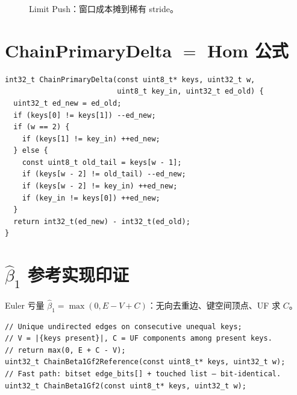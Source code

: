 \begin{figure}[htbp]
\centering
{}
\caption{Limit Push：窗口成本摊到稀有 stride。}
\label{fig:chain-amortize}
\end{figure}

\section{ChainPrimaryDelta $=$ Hom 公式}

\begin{lstlisting}[caption={与 PrimaryTopoDelta 同构},label={lst:chain-delta}]
int32_t ChainPrimaryDelta(const uint8_t* keys, uint32_t w,
                          uint8_t key_in, uint32_t ed_old) {
  uint32_t ed_new = ed_old;
  if (keys[0] != keys[1]) --ed_new;
  if (w == 2) {
    if (keys[1] != key_in) ++ed_new;
  } else {
    const uint8_t old_tail = keys[w - 1];
    if (keys[w - 2] != old_tail) --ed_new;
    if (keys[w - 2] != key_in) ++ed_new;
    if (key_in != keys[0]) ++ed_new;
  }
  return int32_t(ed_new) - int32_t(ed_old);
}
\end{lstlisting}

\section{$\hat\beta_1$ 参考实现印证}

Euler 亏量 $\hat\beta_1=\max(0,E-V+C)$：无向去重边、键空间顶点、UF 求 $C$。

\begin{lstlisting}[caption={ChainBeta1Gf2Reference（测试黄金）},label={lst:beta1-ref}]
// Unique undirected edges on consecutive unequal keys;
// V = |{keys present}|, C = UF components among present keys.
// return max(0, E + C - V);
uint32_t ChainBeta1Gf2Reference(const uint8_t* keys, uint32_t w);
// Fast path: bitset edge_bits[] + touched list — bit-identical.
uint32_t ChainBeta1Gf2(const uint8_t* keys, uint32_t w);
\end{lstlisting}

